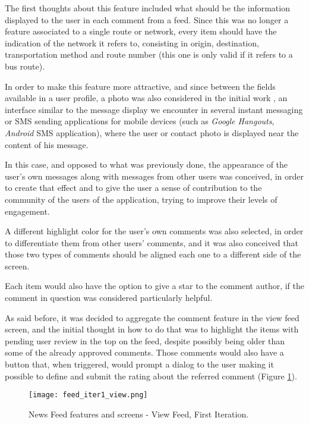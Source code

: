 The first thoughts about this feature included what should be the information displayed to the user in each comment from a feed.
Since this was no longer a feature associated to a single route or network, every item should have the indication of the network it refers to, consisting in origin, destination, transportation method and route number (this one is only valid if it refers to a bus route).

In order to make this feature more attractive, and since between the fields available in a user profile, a photo was also considered in the initial work \cite{kn:eSG12}, an interface similar to the message display we encounter in several instant messaging or SMS sending applications for mobile devices (such as \emph{Google Hangouts}, \emph{Android} SMS application), where the user or contact photo is displayed near the content of his message.

In this case, and opposed to what was previously done, the appearance of the user's own messages along with messages from other users was conceived, in order to create that effect and to give the user a sense of contribution to the community of the users of the application, trying to improve their levels of engagement.

A different highlight color for the user's own comments was also selected, in order to differentiate them from other users' comments, and it was also conceived that those two types of comments should be aligned each one to a different side of the screen.

Each item would also have the option to give a star to the comment author, if the comment in question was considered particularly helpful. 


As said before, it was decided to aggregate the comment feature in the view feed screen, and the initial thought in how to do that was to highlight the items with pending user review in the top on the feed, despite possibly being older than some of the already approved comments. Those comments would also have a button that, when triggered, would prompt a dialog to the user making it possible to define and submit the rating about the referred comment (Figure \ref{fig:feed_iter1_view}).

\begin{figure}[htb]
  \begin{center}
    \leavevmode
    \texttt{[image: feed\_iter1\_view.png]}
    \caption{News Feed features and screens - View Feed, First Iteration.}
    \label{fig:feed_iter1_view}
  \end{center}
\end{figure}

